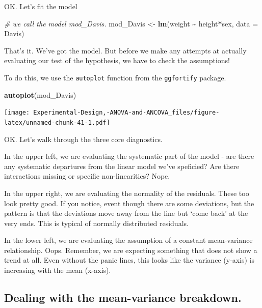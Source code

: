 \documentclass[
]{book}
\newenvironment{Shaded}{\begin{snugshade}}{\end{snugshade}}
\newcommand{\AttributeTok}[1]{\textcolor[rgb]{0.13,0.29,0.53}{#1}}
\newcommand{\CommentTok}[1]{\textcolor[rgb]{0.56,0.35,0.01}{\textit{#1}}}
\newcommand{\FunctionTok}[1]{\textcolor[rgb]{0.13,0.29,0.53}{\textbf{#1}}}
\newcommand{\NormalTok}[1]{#1}
\newcommand{\OtherTok}[1]{\textcolor[rgb]{0.56,0.35,0.01}{#1}}
\newcommand{\SpecialCharTok}[1]{\textcolor[rgb]{0.81,0.36,0.00}{\textbf{#1}}}
\begin{document}
OK. Let's fit the model

\begin{Shaded}
\begin{Highlighting}[]
\CommentTok{\# we call the model mod\_Davis.}
\NormalTok{mod\_Davis }\OtherTok{\textless{}{-}} \FunctionTok{lm}\NormalTok{(weight }\SpecialCharTok{\textasciitilde{}}\NormalTok{ height}\SpecialCharTok{*}\NormalTok{sex, }\AttributeTok{data =}\NormalTok{ Davis)}
\end{Highlighting}
\end{Shaded}

That's it. We've got the model. But before we make any attempts at actually evaluating our test of the hypothesis, we have to check the assumptions!

To do this, we use the \texttt{autoplot} function from the \texttt{ggfortify} package.

\begin{Shaded}
\begin{Highlighting}[]
\FunctionTok{autoplot}\NormalTok{(mod\_Davis)}
\end{Highlighting}
\end{Shaded}

\texttt{[image: Experimental-Design,-ANOVA-and-ANCOVA\_files/figure-latex/unnamed-chunk-41-1.pdf]}

OK. Let's walk through the three core diagnostics.

In the upper left, we are evaluating the systematic part of the model - are there any systematic departures from the linear model we've speficied? Are there interactions missing or specific non-linearities? Nope.

In the upper right, we are evaluating the normality of the residuals. These too look pretty good. If you notice, event though there are some deviations, but the pattern is that the deviations move away from the line but `come back' at the very ends. This is typical of normally distributed residuals.

In the lower left, we are evaluating the assumption of a constant mean-variance relationship. Oops. Remember, we are expecting something that does not show a trend at all. Even without the panic lines, this looks like the variance (y-axis) is increasing with the mean (x-axis).

\hypertarget{dealing-with-the-mean-variance-breakdown.}{%
\subsection{Dealing with the mean-variance breakdown.}\label{dealing-with-the-mean-variance-breakdown.}}
\end{document}
